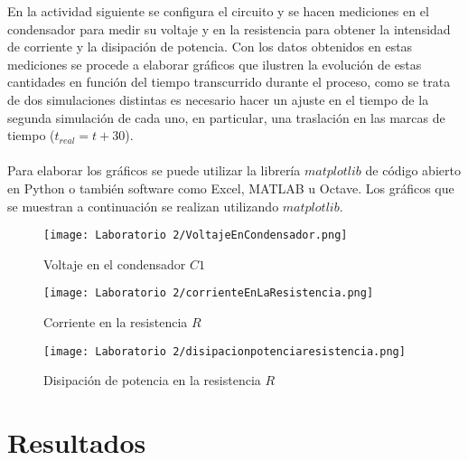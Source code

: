 \documentclass[letterpaper,11pt]{article} %
\begin{document}
En la actividad siguiente se configura el circuito y se hacen mediciones en el condensador para medir su voltaje y en la resistencia para obtener la intensidad de corriente y la disipación de potencia. Con los datos obtenidos en estas mediciones se procede a elaborar gráficos que ilustren la evolución de estas cantidades en función del tiempo transcurrido durante el proceso, como se trata de dos simulaciones distintas es necesario hacer un ajuste en el tiempo de la segunda simulación de cada uno, en particular, una traslación en las marcas de tiempo ($t_{real} = t+30$).\\
\\
Para elaborar los gráficos se puede utilizar la librería $matplotlib$ de código abierto en Python o también software como Excel, MATLAB u Octave. Los gráficos que se muestran a continuación se realizan utilizando $matplotlib$. %

\newpage
\begin{figure}
    \centering
    \texttt{[image: Laboratorio 2/VoltajeEnCondensador.png]}
    \caption{Voltaje en el condensador $C1$}
    \label{fig:voltaje_C1}
\end{figure}
\begin{figure}
    \centering
    \texttt{[image: Laboratorio 2/corrienteEnLaResistencia.png]}
    \caption{Corriente en la resistencia $R$}
    \label{fig:intensidad_R}
\end{figure}
\begin{figure}
    \centering
    \texttt{[image: Laboratorio 2/disipacionpotenciaresistencia.png]}
    \caption{Disipación de potencia en la resistencia $R$}
    \label{fig:disipación_R}
\end{figure}
\newpage



\section{Resultados}
\end{document}
